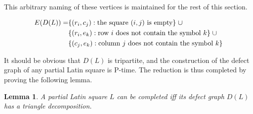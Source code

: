 \documentclass[12pt]{article}
\newtheorem{lemma}[theorem]{Lemma}
\theoremstyle{definition}
\theoremstyle{remark}
\begin{document}
This arbitrary naming of these vertices is maintained for the rest of this section.

\begin{align*}
	E(D(L)) = &\{ (r_i, c_j) : \textnormal{the square } (i, j) \textnormal{ is empty} \} \; \cup \\
	&\{ (r_i, e_k) : \textnormal{row } i \textnormal{ does not contain the symbol } k \} \; \cup \\
	&\{ (c_j, e_k) : \textnormal{column } j \textnormal{ does not contain the symbol } k \}
\end{align*}

It should be obvious that $D(L)$ is tripartite, and the construction of the defect graph of any partial Latin square is P-time. The reduction is thus completed by proving the following lemma.

\begin{lemma}
	\label{lem:defect}
	A partial Latin square $L$ can be completed iff its defect graph $D(L)$ has a triangle decomposition.
\end{lemma}
\end{document}

